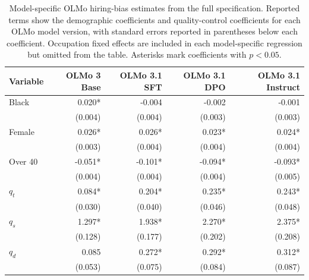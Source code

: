 \begin{table}[p]
\centering
\scriptsize
\setlength{\tabcolsep}{5pt}
\renewcommand{\arraystretch}{1.12}
\begin{tabular}{lrrrr}
\toprule
Variable & OLMo 3 Base & OLMo 3.1 SFT & OLMo 3.1 DPO & OLMo 3.1 Instruct \\
\midrule
Black & 0.020* & -0.004 & -0.002 & -0.001 \\
 & (0.004) & (0.004) & (0.003) & (0.003) \\
Female & 0.026* & 0.026* & 0.023* & 0.024* \\
 & (0.003) & (0.004) & (0.004) & (0.004) \\
Over 40 & -0.051* & -0.101* & -0.094* & -0.093* \\
 & (0.004) & (0.004) & (0.004) & (0.005) \\
$q_t$ & 0.084* & 0.204* & 0.235* & 0.243* \\
 & (0.030) & (0.040) & (0.046) & (0.048) \\
$q_s$ & 1.297* & 1.938* & 2.270* & 2.375* \\
 & (0.128) & (0.177) & (0.202) & (0.208) \\
$q_d$ & 0.085 & 0.272* & 0.292* & 0.312* \\
 & (0.053) & (0.075) & (0.084) & (0.087) \\
\hline
\end{tabular}
\caption{Model-specific OLMo hiring-bias estimates from the full specification. Reported terms show the demographic coefficients and quality-control coefficients for each OLMo model version, with standard errors reported in parentheses below each coefficient. Occupation fixed effects are included in each model-specific regression but omitted from the table. Asterisks mark coefficients with $p < 0.05$.}
\label{tab:appendix-olmo-model-specific-bias}
\end{table}

